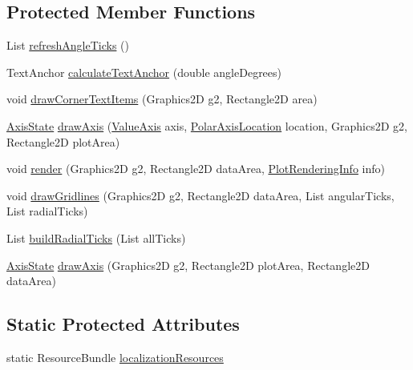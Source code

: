 \subsection*{Protected Member Functions}
\begin{DoxyCompactItemize}
\item 
List \mbox{\hyperlink{classorg_1_1jfree_1_1chart_1_1plot_1_1_polar_plot_a051265d6d552b2c20c6baac9fb02dcbe}{refresh\+Angle\+Ticks}} ()
\item 
Text\+Anchor \mbox{\hyperlink{classorg_1_1jfree_1_1chart_1_1plot_1_1_polar_plot_a25b02ca01086c46485c32e8bc2f857a0}{calculate\+Text\+Anchor}} (double angle\+Degrees)
\item 
void \mbox{\hyperlink{classorg_1_1jfree_1_1chart_1_1plot_1_1_polar_plot_af52f224f74d5431115313fbe82723075}{draw\+Corner\+Text\+Items}} (Graphics2D g2, Rectangle2D area)
\item 
\mbox{\hyperlink{classorg_1_1jfree_1_1chart_1_1axis_1_1_axis_state}{Axis\+State}} \mbox{\hyperlink{classorg_1_1jfree_1_1chart_1_1plot_1_1_polar_plot_a1e4d5cbe340677469af3bd5490232435}{draw\+Axis}} (\mbox{\hyperlink{classorg_1_1jfree_1_1chart_1_1axis_1_1_value_axis}{Value\+Axis}} axis, \mbox{\hyperlink{classorg_1_1jfree_1_1chart_1_1plot_1_1_polar_axis_location}{Polar\+Axis\+Location}} location, Graphics2D g2, Rectangle2D plot\+Area)
\item 
void \mbox{\hyperlink{classorg_1_1jfree_1_1chart_1_1plot_1_1_polar_plot_a039a336f4ee16615efa0e312dccbd686}{render}} (Graphics2D g2, Rectangle2D data\+Area, \mbox{\hyperlink{classorg_1_1jfree_1_1chart_1_1plot_1_1_plot_rendering_info}{Plot\+Rendering\+Info}} info)
\item 
void \mbox{\hyperlink{classorg_1_1jfree_1_1chart_1_1plot_1_1_polar_plot_ae2ecafa1e852b6a93edddcb2944e9bd8}{draw\+Gridlines}} (Graphics2D g2, Rectangle2D data\+Area, List angular\+Ticks, List radial\+Ticks)
\item 
List \mbox{\hyperlink{classorg_1_1jfree_1_1chart_1_1plot_1_1_polar_plot_ac3e30276923aea8b9c62c10968228fcc}{build\+Radial\+Ticks}} (List all\+Ticks)
\item 
\mbox{\hyperlink{classorg_1_1jfree_1_1chart_1_1axis_1_1_axis_state}{Axis\+State}} \mbox{\hyperlink{classorg_1_1jfree_1_1chart_1_1plot_1_1_polar_plot_a2d066df3840deb3146bf16b33c0e02e3}{draw\+Axis}} (Graphics2D g2, Rectangle2D plot\+Area, Rectangle2D data\+Area)
\end{DoxyCompactItemize}
\subsection*{Static Protected Attributes}
\begin{DoxyCompactItemize}
\item 
static Resource\+Bundle \mbox{\hyperlink{classorg_1_1jfree_1_1chart_1_1plot_1_1_polar_plot_a5208e45031fd3563b3fc6f5fd2d264ea}{localization\+Resources}}
\end{DoxyCompactItemize}

